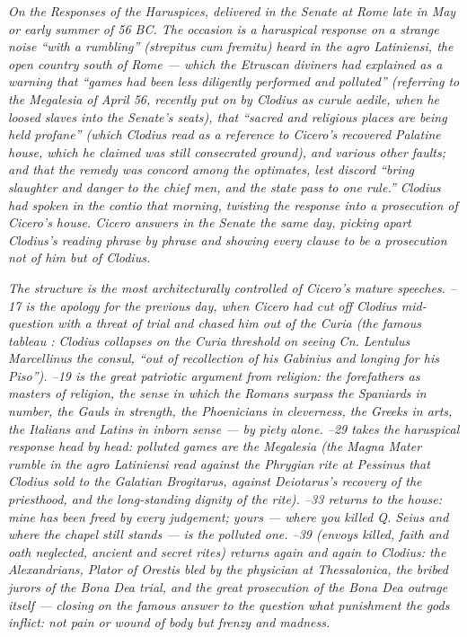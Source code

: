 
\textit{On the Responses of the Haruspices, delivered in the
Senate at Rome late in May or early summer of 56 BC. The
occasion is a haruspical response on a strange noise
``with a rumbling'' (\textit{strepitus cum fremitu})
heard in the agro Latiniensi, the open country south of
Rome --- which the Etruscan diviners had explained as a
warning that ``games had been less diligently performed
and polluted'' (referring to the Megalesia of April 56,
recently put on by Clodius as curule aedile, when he
loosed slaves into the Senate's seats), that ``sacred
and religious places are being held profane'' (which
Clodius read as a reference to Cicero's recovered
Palatine house, which he claimed was still consecrated
ground), and various other faults; and that the
remedy was concord among the optimates, lest discord
``bring slaughter and danger to the chief men, and the
state pass to one rule.'' Clodius had spoken in the
contio that morning, twisting the response into a
prosecution of Cicero's house. Cicero answers in the
Senate the same day, picking apart Clodius's reading
phrase by phrase and showing every clause to be a
prosecution not of him but of Clodius.}

\textit{The structure is the most architecturally
controlled of Cicero's mature speeches. --17 is the apology for the previous day, when Cicero
had cut off Clodius mid-question with a threat of trial
and chased him out of the Curia (the famous tableau
: Clodius collapses on the Curia threshold
on seeing Cn. Lentulus Marcellinus the consul, ``out of
recollection of his Gabinius and longing for his Piso'').
--19 is the great patriotic argument from
religion: the forefathers as masters of religion, the
sense in which the Romans surpass the Spaniards in number,
the Gauls in strength, the Phoenicians in cleverness, the
Greeks in arts, the Italians and Latins in inborn sense
--- by piety alone. --29 takes the
haruspical response head by head: polluted games are the
Megalesia (the Magna Mater rumble in the agro Latiniensi
read against the Phrygian rite at Pessinus that Clodius
sold to the Galatian Brogitarus, against Deiotarus's
recovery of the priesthood, and the long-standing dignity
of the rite). --33 returns to the house:
mine has been freed by every judgement; yours --- where
you killed Q. Seius and where the chapel still stands ---
is the polluted one. --39 (envoys killed,
faith and oath neglected, ancient and secret rites)
returns again and again to Clodius: the Alexandrians,
Plator of Orestis bled by the physician at Thessalonica,
the bribed jurors of the Bona Dea trial, and the great
prosecution of the Bona Dea outrage itself --- closing
on the famous answer to the question what punishment the
gods inflict: not pain or wound of body but frenzy and
madness.}

